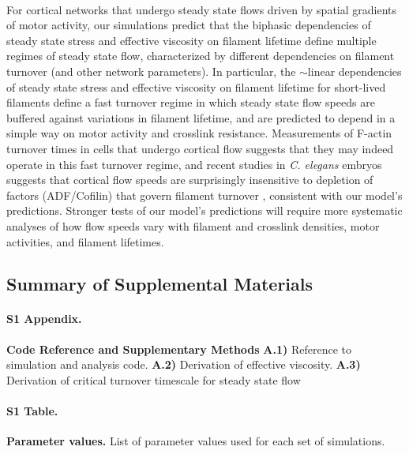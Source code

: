 \paragraph{} For cortical networks that undergo steady state flows driven by spatial gradients of motor activity, our simulations predict that the biphasic dependencies of steady state stress and effective viscosity on filament lifetime define multiple regimes of steady state flow, characterized by different dependencies on filament turnover (and other network parameters).  In particular, the $\sim$linear dependencies of steady state stress and effective viscosity on filament lifetime for short-lived filaments define a fast turnover regime in which steady state flow speeds are buffered against variations in filament lifetime, and are predicted to depend in a simple way on motor activity and crosslink resistance.  Measurements of F-actin turnover times in cells that undergo cortical flow \cite{Theriot1991,Murthy2016,Watanabe1083,Guha2016,Fritzsche15032013,Robin:2014aa} suggests that they may indeed operate in this fast turnover regime, and recent studies in {\em C. elegans} embryos suggests that cortical flow speeds are surprisingly insensitive to depletion of factors (ADF/Cofilin) that govern filament turnover \cite{cellmech_flows}, consistent with our model's predictions. Stronger tests of our model's predictions will require more systematic analyses of how flow speeds vary with filament and crosslink densities, motor activities, and filament lifetimes.


\subsection{Summary of Supplemental Materials}

\paragraph{S1 Appendix.}
\label{S1_Text}
{\bf Code Reference and Supplementary Methods}  \textbf{A.1)} Reference to simulation and analysis code. \textbf{A.2)} Derivation of effective viscosity. \textbf{A.3)} Derivation of critical turnover timescale for steady state flow

\paragraph{S1 Table.}
\label{S1_Table}
{\bf Parameter values.}  List of parameter values used for each set of simulations.



